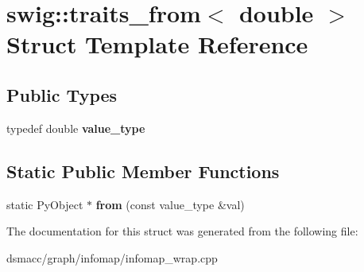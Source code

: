 \hypertarget{structswig_1_1traits__from_3_01double_01_4}{}\section{swig\+:\+:traits\+\_\+from$<$ double $>$ Struct Template Reference}
\label{structswig_1_1traits__from_3_01double_01_4}
\subsection*{Public Types}
\begin{DoxyCompactItemize}
\item 
\mbox{\label{structswig_1_1traits__from_3_01double_01_4_a91858e8bb1587ef10fc2c5e277abcc33}} 
typedef double {\bfseries value\+\_\+type}
\end{DoxyCompactItemize}
\subsection*{Static Public Member Functions}
\begin{DoxyCompactItemize}
\item 
\mbox{\label{structswig_1_1traits__from_3_01double_01_4_ae561b4392eb983662f203737585c2241}} 
static Py\+Object $\ast$ {\bfseries from} (const value\+\_\+type \&val)
\end{DoxyCompactItemize}


The documentation for this struct was generated from the following file\+:\begin{DoxyCompactItemize}
\item 
dsmacc/graph/infomap/infomap\+\_\+wrap.\+cpp\end{DoxyCompactItemize}
